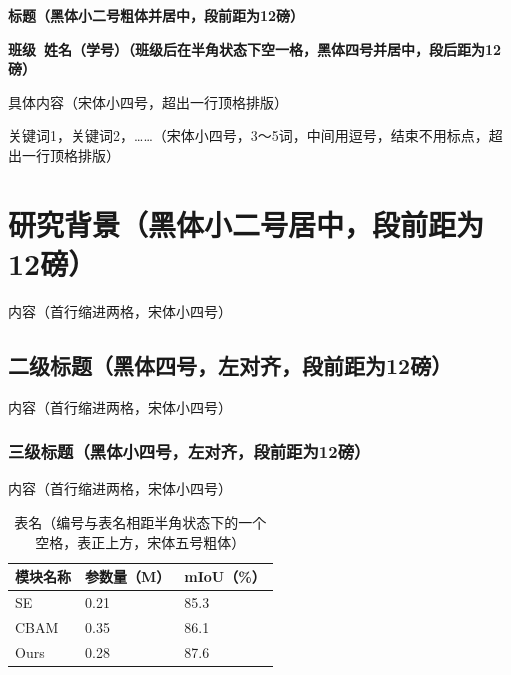\documentclass[zihao=-4, linespread=1.25]{ctexart} %
\numberwithin{equation}{section} %
\numberwithin{figure}{section} %
\newenvironment{abstractcn}{%
  \par\noindent{\sffamily\bfseries\zihao{-4} 摘要：}\ignorespaces
}{%
  \par\vspace{6bp}
}
\newenvironment{keywordscn}{%
  \par\noindent{\sffamily\bfseries\zihao{-4} 关键词：}\ignorespaces
}{%
  \par\vspace{12bp}
}
\begin{document}
\begin{center}
  \vspace{12bp}  %
  {\sffamily\bfseries{} 标题（黑体小二号粗体并居中，段前距为12磅）}  %
  \vspace{12bp}

  {\sffamily\bfseries{} 班级\ 姓{\quad}名（学号）（班级后在半角状态下空一格，黑体四号并居中，段后距为12磅）}  %
  \vspace{12bp}
\end{center}

\begin{abstractcn}
  具体内容（宋体小四号，超出一行顶格排版）
\end{abstractcn}

\begin{keywordscn}
  关键词1，关键词2，……（宋体小四号，3～5词，中间用逗号，结束不用标点，超出一行顶格排版）
\end{keywordscn}

\vspace{12bp}

\section{研究背景（黑体小二号居中，段前距为12磅）}

内容（首行缩进两格，宋体小四号）

\subsection{二级标题（黑体四号，左对齐，段前距为12磅）}

内容（首行缩进两格，宋体小四号）

\subsubsection{三级标题（黑体小四号，左对齐，段前距为12磅）}

内容（首行缩进两格，宋体小四号）

\begin{table}[htbp]
  \centering
  {\songti                 %
  \caption{表名（编号与表名相距半角状态下的一个空格，表正上方，宋体五号粗体）}
  \label{tab:attention}
  \begin{tabularx}{\textwidth}{XXX}
    \toprule
    模块名称 & 参数量（M） & mIoU（\%） \\
    \midrule
    SE       & 0.21 & 85.3 \\
    CBAM     & 0.35 & 86.1 \\
    Ours     & 0.28 & 87.6 \\
    \bottomrule
  \end{tabularx}
  }
\end{table}
\end{document}
